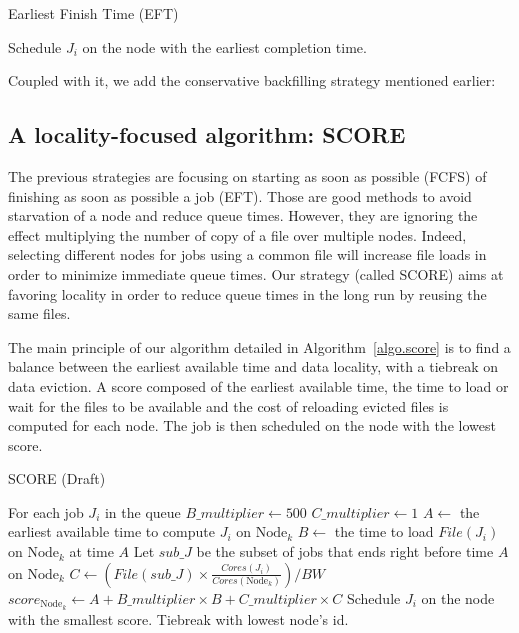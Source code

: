 \documentclass[conference,10pt]{IEEEtran}
\newcommand{\Node}[1]{\ensuremath{\mathrm{Node}_{#1}}\xspace}
\newcommand{\file}{\ensuremath{\mathit{File}}\xspace}
\newcommand{\memory}{\ensuremath{\mathit{Mem}}\xspace}
\newcommand{\bandwidth}{\mathit{BW}\xspace}
\newcommand{\core}{\mathit{Cores}\xspace}
\newcommand{\jobset}{\ensuremath{\mathbb{J}}\xspace}
\newcommand{\nodeset}{\ensuremath{\mathbb{N}}\xspace}
\begin{document}
\begin{algorithm}[htbp]
	\caption{Earliest Finish Time (EFT)}\label{algo.eft}
	\begin{algorithmic}[1]
		\For{$J_i \in \jobset$}
			\State Schedule $J_i$ on the node with the earliest completion time.
		\EndFor
	\end{algorithmic}
\end{algorithm}

Coupled with it, we add the conservative backfilling strategy mentioned earlier:

\subsection{A locality-focused algorithm: SCORE}

The previous strategies are focusing on starting as soon as possible (FCFS)
of finishing as soon as possible a job (EFT).
Those are good methods to avoid starvation of a node and reduce queue times.
However, they are ignoring the effect multiplying the number of copy of a file
over multiple nodes. Indeed, selecting different nodes for jobs using a common
file will increase file loads in order to minimize immediate queue times.
Our strategy (called SCORE) aims at favoring locality in order to reduce
queue times in the long run by reusing the same files. 

The main principle of our algorithm detailed in Algorithm~\ref{algo.score} 
is to find a balance between the earliest available time and data locality,
with a tiebreak on data eviction. A score composed of the earliest available 
time, the time to load or wait for the files to be available and the cost of 
reloading evicted files is computed for each node. The job is then scheduled
on the node with the lowest score.

\begin{algorithm}[htbp]\caption{SCORE (Draft)}\label{algo.score}\begin{algorithmic}[1]
	\Statex For each job $J_i$ in the queue
	\State $B\_multiplier \gets 500$
	\State $C\_multiplier \gets 1$
	\ForEach {$\Node{k} \in \nodeset$}
		\State $A \gets$ the earliest available time to compute $J_i$ on $\Node{k}$
		\State $B \gets$ the time to load $\file(J_i)$ on $\Node{k}$ at time $A$ 
		\State Let $\mathit{sub\_J}$ be the subset of jobs that ends right before time $A$ on $\Node{k}$
		\State $C \gets (\file(\mathit{sub\_J}) \times \frac{\core(J_i)}{\core(\Node{k})})/\bandwidth$
		\State $score_{\Node{k}} \gets A + B\_multiplier \times B + C\_multiplier \times C$
	\EndFor
	\State Schedule $J_i$ on the node with the smallest score. Tiebreak with lowest node's id.
\end{algorithmic}\end{algorithm}
\end{document}

